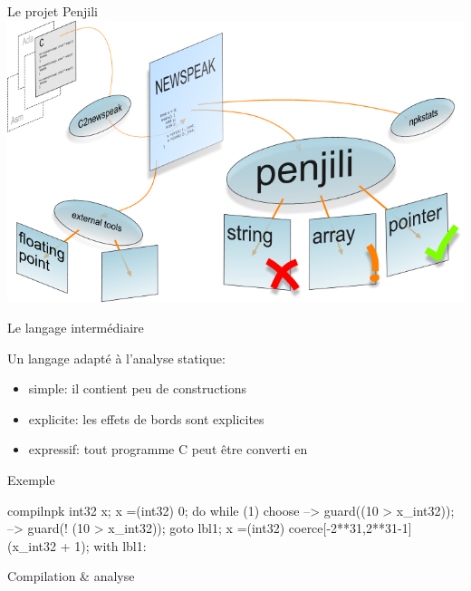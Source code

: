 \section{\newspeak}

\begin{frame}{Le projet Penjili}
\centering
\includegraphics[scale=.5]{img/penjili.png}
\end{frame}

\begin{frame}{Le langage intermédiaire \newspeak}

Un langage adapté à l'analyse statique:

\begin{itemize}
\item simple: il contient peu de constructions
\item explicite: les effets de bords sont explicites
\item expressif: tout programme C peut être converti en \newspeak
\end{itemize}

\end{frame}

\begin{frame}[fragile]{Exemple}

\begin{SaveVerbatim}{compilnpk}
int32 x;
x =(int32) 0;
do {
    while (1) {
        choose {
            -->
                guard((10 > x_int32));
            -->
                guard(! (10 > x_int32));
                goto lbl1;
        }
        x =(int32) coerce[-2**31,2**31-1]
                        (x_int32 + 1);
    }
} with lbl1: {
}
\end{SaveVerbatim}

{\footnotesize
\begin{minipage}{0.3\linewidth}
\end{minipage}
\vrule\hspace{2pt}
\begin{minipage}{0.6\linewidth}
\end{minipage}
}

\end{frame}

\begin{frame}{Compilation \& analyse}




\end{frame}
